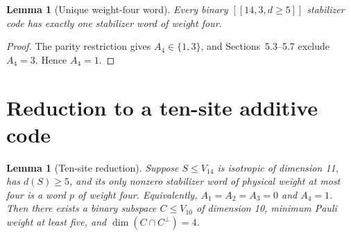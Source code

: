 \documentclass[11pt]{article}
\newtheorem{lemma}[theorem]{Lemma}
\begin{document}
\begin{lemma}[Unique weight-four word]\label{lem:unique-check}
Every binary \(\left[\!\left[14,3,d\geq5\right]\!\right]\) stabilizer code has exactly one stabilizer word of weight four.
\end{lemma}
\begin{proof}
The parity restriction gives \(A_4\in\{1,3\}\), and Sections~5.3--5.7 exclude \(A_4=3\). Hence \(A_4=1\).
\end{proof}

\section{Reduction to a ten-site additive code}\label{reduction-to-a-ten-site-additive-code}

\begin{lemma}[Ten-site reduction]\label{lem:ten-site}
Suppose \(S\leq V_{14}\) is isotropic of dimension 11, has \(d(S)\geq5\), and its only nonzero stabilizer word of physical weight at most four is a word \(p\) of weight four. Equivalently, \(A_1=A_2=A_3=0\) and \(A_4=1\). Then there exists a binary subspace \(C\leq V_{10}\) of dimension 10, minimum Pauli weight at least five, and \(\dim(C\cap C^\perp)=4\).
\end{lemma}
\end{document}
